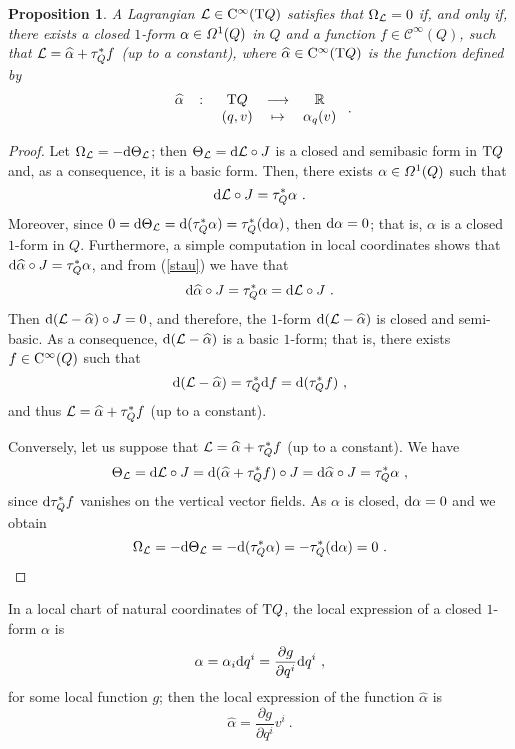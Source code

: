 \documentclass[12pt]{report}
\newtheorem{prop}[teor]{Proposition}
\def\derpar#1#2{\frac{\partial{#1}}{\partial{#2}}}
\def\qed{\ifvmode\removelastskip\fi
{\unskip\nobreak\hfil\penalty50\hbox{}\nobreak\hfil
\hbox{\vrule height1.2ex width1.2ex}\parfillskip=0pt
\finalhyphendemerits=0 \par\smallskip}}
\def\df{{\mit\Omega}}
\def\Lag{{\cal L}}
\def\d{{\rm d}}
\def\Real{\mathbb{R}}
\def\Tan{{\rm T}}
\def\Cinfty{{\rm C}^\infty}
\begin{document}
\begin{prop}
\label{omega=0}
A Lagrangian $\Lag\in\Cinfty(\Tan Q)$ satisfies that
$\Omega_\Lag=0$ if, and only if, there exists a closed $1$-form
$\alpha\in\df^1(Q)$ in $Q$ and a  function
$f\in \mathcal{C}^\infty(Q)$, such that 
$\Lag=\widehat{\alpha}+\tau_Q^*f$ (up to a constant), 
where $\widehat\alpha\in\Cinfty (\Tan Q)$ is the function defined by
$$
\begin{array}{ccccc}
\widehat\alpha&\colon&\Tan Q&\longrightarrow&\Real
\\ & & (q,v) & \mapsto &\alpha_q(v)
\end{array}\ .
$$
\end{prop}
\begin{proof}
Let $\Omega_\Lag=-\d\Theta_\Lag$; then $\Theta_\Lag=\d\Lag\circ J$
is a closed and semibasic form in $\Tan Q$ and, as a consequence,
it is a basic form. Then, there exists $\alpha\in\df^1(Q)$ such that
\begin{equation}
\label{stau}
\d\Lag\circ J=\tau_Q^*\alpha \ .
\end{equation}
 Moreover, since $0=\d\Theta_\Lag=\d(\tau_Q^*\alpha)=\tau_Q^*(\d\alpha)$,
then $\d\alpha=0$; that is, $\alpha$ is a closed $1$-form in $Q$.
Furthermore, a simple computation in local coordinates shows that
 $\d\widehat\alpha\circ J=\tau_Q^*\alpha$, and from (\ref{stau}) we have that
 $$
\d\widehat\alpha\circ J=\tau_Q^*\alpha = \d\Lag\circ J \ .
$$
Then $\d(\Lag-\widehat\alpha)\circ J=0$, and therefore, the $1$-form 
$\d(\Lag-\widehat\alpha)$ is closed and semi-basic. 
As a consequence, $\d(\Lag-\widehat\alpha)$ is a basic $1$-form; 
that is, there exists $f\in\Cinfty(Q)$ such that
 $$
\d(\Lag-\widehat\alpha)=\tau_Q^*\d f=\d(\tau_Q^*f) \ ,
$$
and thus
 $\Lag=\widehat\alpha+\tau_Q^*f$ (up to a constant).

Conversely, let us suppose that $\Lag=\widehat\alpha+\tau_Q^*f$ 
(up to a constant). We have
$$
 \Theta_\Lag=\d\Lag\circ J=\d(\widehat\alpha+\tau_Q^*f)\circ J=
\d\widehat\alpha\circ J=\tau_Q^*\alpha  \ ,
$$
since $\d\tau_Q^*f$ vanishes on the vertical vector fields.
As $\alpha$ is closed, $\d\alpha=0$ and we obtain
$$
\Omega_\Lag=-\d\Theta_\Lag=-\d(\tau_Q^*\alpha)=-\tau_Q^*(\d\alpha)=0 \ .
$$
\qed \end{proof}

In a local chart of natural coordinates of $\Tan Q$,
the local expression of a closed $1$-form $\alpha$ is
\begin{displaymath}
\alpha =\alpha_i\d q^i=\derpar{g}{q^i}\d q^i \ ,
\end{displaymath}
for some local function $g$;
then the local expression of the function $\widehat\alpha$ is 
\begin{displaymath}
\widehat\alpha=\derpar{g}{q^i}v^i \ .
\end{displaymath} 
\end{document}
